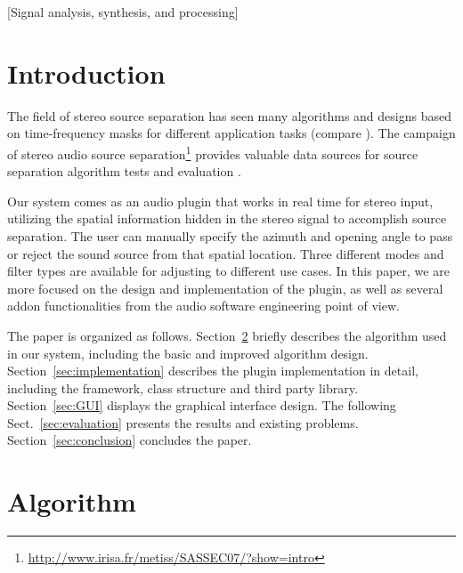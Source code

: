 \documentclass{sig-alternate}
\begin{document}
[Signal analysis, synthesis, and processing]



\section{Introduction}

The field of stereo source separation has seen many algorithms and designs based on time-frequency masks for different application tasks (compare \cite{Nakadai:02, Araki:09, Cobos:08, Woodruff:06, Vincent:06}).  The campaign of stereo audio source separation\footnote{\url{http://www.irisa.fr/metiss/SASSEC07/?show=intro}} provides valuable data sources for source separation algorithm tests and evaluation \cite{Vincent:07, Vincent:12}. 

    Our system comes as an audio plugin that works in real time for stereo input, utilizing the spatial information hidden in the stereo signal to accomplish source separation. The user can manually specify the azimuth and opening angle to pass or reject the sound source from that spatial location. Three different modes and filter types are available for adjusting to different use cases. In this paper, we are more focused on the design and implementation of the plugin, as well as several addon functionalities from the audio software engineering point of view. 

    The paper is organized as follows. Section~\ref{sec:algorithm_desc} briefly describes the algorithm used in our system, including the basic and improved algorithm design. Section~\ref{sec:implementation} describes the plugin implementation in detail, including the framework, class structure and third party library. Section~\ref{sec:GUI} displays the graphical interface design. The following Sect.~\ref{sec:evaluation} presents the results and existing problems. Section~\ref{sec:conclusion} concludes the paper. 

\section{Algorithm}\label{sec:algorithm_desc}
\end{document}
